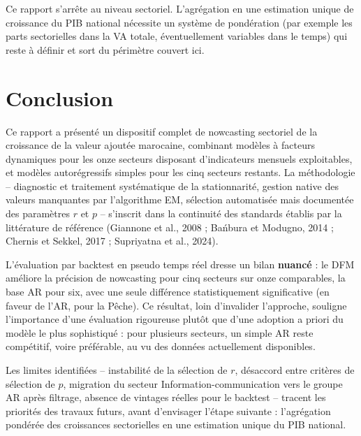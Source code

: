 \documentclass[11pt,a4paper]{report}
\begin{document}
Ce rapport s'arrête au niveau sectoriel. L'agrégation en une estimation unique de croissance du PIB national nécessite un système de pondération (par exemple les parts sectorielles dans la VA totale, éventuellement variables dans le temps) qui reste à définir et sort du périmètre couvert ici.


\chapter{Conclusion}

Ce rapport a présenté un dispositif complet de nowcasting sectoriel de la croissance de la valeur ajoutée marocaine, combinant modèles à facteurs dynamiques pour les onze secteurs disposant d'indicateurs mensuels exploitables, et modèles autorégressifs simples pour les cinq secteurs restants. La méthodologie -- diagnostic et traitement systématique de la stationnarité, gestion native des valeurs manquantes par l'algorithme EM, sélection automatisée mais documentée des paramètres $r$ et $p$ -- s'inscrit dans la continuité des standards établis par la littérature de référence (Giannone et al., 2008 ; Bańbura et Modugno, 2014 ; Chernis et Sekkel, 2017 ; Supriyatna et al., 2024).

L'évaluation par backtest en pseudo temps réel dresse un bilan \textbf{nuancé} : le DFM améliore la précision de nowcasting pour cinq secteurs sur onze comparables, la base AR pour six, avec une seule différence statistiquement significative (en faveur de l'AR, pour la Pêche). Ce résultat, loin d'invalider l'approche, souligne l'importance d'une évaluation rigoureuse plutôt que d'une adoption a priori du modèle le plus sophistiqué : pour plusieurs secteurs, un simple AR reste compétitif, voire préférable, au vu des données actuellement disponibles.

Les limites identifiées -- instabilité de la sélection de $r$, désaccord entre critères de sélection de $p$, migration du secteur Information-communication vers le groupe AR après filtrage, absence de vintages réelles pour le backtest -- tracent les priorités des travaux futurs, avant d'envisager l'étape suivante : l'agrégation pondérée des croissances sectorielles en une estimation unique du PIB national.
\end{document}
